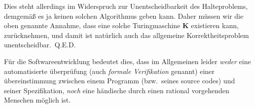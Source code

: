 Dies steht allerdings im Widerspruch zur Unentscheidbarkeit des Halteproblems, demge\-mäß es ja keinen solchen Algorithmus geben kann. Daher müssen wir die oben genannte Annahme, dass eine solche Turingmaschine $\mathbf{K}$ existieren kann, zurücknehmen, und damit ist natürlich auch das allgemeine Korrektheitsproblem unentscheidbar.~Q.E.D.\newline

\noindent Für die Softwareentwicklung bedeutet dies, dass im Allgemeinen leider \emph{weder} eine automatisierte überprüfung (auch \emph{formale Verifikation} genannt) einer übereinstimmung zwischen einem Programm (bzw.\ seines source codes) und seiner Spezifikation, \emph{noch} eine händische durch einen rational vorgehenden Menschen möglich ist.
